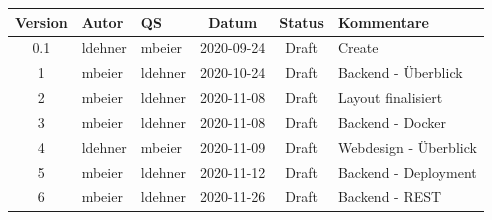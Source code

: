 \documentclass[minted, notitle]{protocol}
\begin{document}
\begin{center}

\begin{tabular}{| c | p{1.8cm} | p{1.8cm} | c | c | p{3.4cm} |}
\hline \rowcolor{gray} \textbf{\color{white}Version} & \textbf{\color{white}Autor} & \textbf{\color{white}QS} & \textbf{\color{white}Datum} & \textbf{\color{white}Status} & \textbf{\color{white}Kommentare} \\ 
 \hline \hline
0.1 & ldehner & mbeier  & 2020-09-24 & Draft & Create \\ \hline 
1   & mbeier  & ldehner & 2020-10-24 & Draft & Backend - Überblick \\ \hline
2   & mbeier  & ldehner & 2020-11-08 & Draft & Layout finalisiert \\ \hline
3   & mbeier  & ldehner & 2020-11-08 & Draft & Backend - Docker \\ \hline
4   & ldehner  & mbeier & 2020-11-09 & Draft & Webdesign - Überblick \\ \hline
5   & mbeier  & ldehner & 2020-11-12 & Draft & Backend - Deployment \\ \hline
6   & mbeier  & ldehner & 2020-11-26 & Draft & Backend - REST \\ \hline

\end{tabular}
\end{center}

\clearpage
{
  \hypersetup{linkcolor=black}
  \tableofcontents
} 
\clearpage



\end{document}

